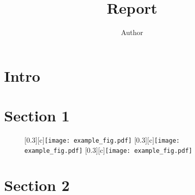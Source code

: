 \documentclass[a4paper, 12pt]{article}
\title{Report}
\author{Author}
\begin{document}
\maketitle
\sloppy
\begin{abstract}

\end{abstract}

\section*{Intro}

\section{Section 1}

\begin{figure}[htbp]
\centering
{}[0.3\linewidth][c]{\texttt{[image: example\_fig.pdf]}}
[0.3\linewidth][c]{\texttt{[image: example\_fig.pdf]}}
[0.3\linewidth][c]{\texttt{[image: example\_fig.pdf]}}
\caption{\label{fig:example}\cite{example_ref}}
\end{figure}

\section{Section 2}

\printbibliography
\end{document}
